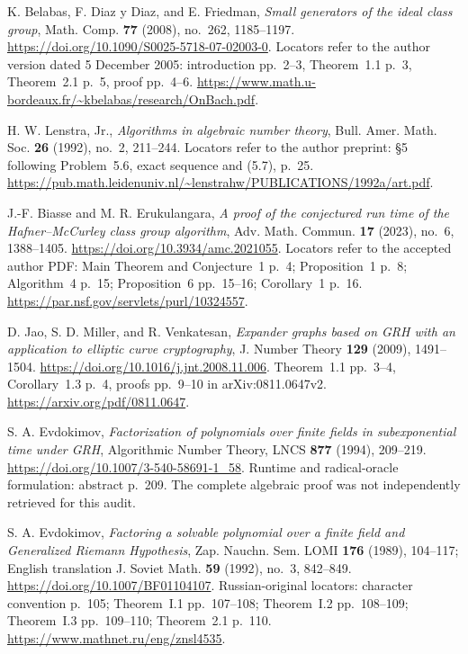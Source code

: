 K. Belabas, F. Diaz y Diaz, and E. Friedman,
\emph{Small generators of the ideal class group},
Math. Comp. \textbf{77} (2008), no.~262, 1185--1197.
\url{https://doi.org/10.1090/S0025-5718-07-02003-0}.
Locators refer to the author version dated 5 December 2005:
introduction pp.~2--3, Theorem~1.1 p.~3, Theorem~2.1 p.~5,
proof pp.~4--6.
\url{https://www.math.u-bordeaux.fr/~kbelabas/research/OnBach.pdf}.

H. W. Lenstra, Jr., \emph{Algorithms in algebraic number theory},
Bull. Amer. Math. Soc. \textbf{26} (1992), no.~2, 211--244.
Locators refer to the author preprint:
\S5 following Problem~5.6, exact sequence and (5.7), p.~25.
\url{https://pub.math.leidenuniv.nl/~lenstrahw/PUBLICATIONS/1992a/art.pdf}.

J.-F. Biasse and M. R. Erukulangara,
\emph{A proof of the conjectured run time of the Hafner--McCurley class group algorithm},
Adv. Math. Commun. \textbf{17} (2023), no.~6, 1388--1405.
\url{https://doi.org/10.3934/amc.2021055}.
Locators refer to the accepted author PDF: Main Theorem and Conjecture~1 p.~4;
Proposition~1 p.~8; Algorithm~4 p.~15; Proposition~6 pp.~15--16;
Corollary~1 p.~16.
\url{https://par.nsf.gov/servlets/purl/10324557}.

D. Jao, S. D. Miller, and R. Venkatesan,
\emph{Expander graphs based on GRH with an application to elliptic curve cryptography},
J. Number Theory \textbf{129} (2009), 1491--1504.
\url{https://doi.org/10.1016/j.jnt.2008.11.006}.
Theorem~1.1 pp.~3--4, Corollary~1.3 p.~4, proofs pp.~9--10
in arXiv:0811.0647v2.
\url{https://arxiv.org/pdf/0811.0647}.

S. A. Evdokimov,
\emph{Factorization of polynomials over finite fields in subexponential time under GRH},
Algorithmic Number Theory, LNCS \textbf{877} (1994), 209--219.
\url{https://doi.org/10.1007/3-540-58691-1_58}.
Runtime and radical-oracle formulation: abstract p.~209.
The complete algebraic proof was not independently retrieved for this audit.

S. A. Evdokimov,
\emph{Factoring a solvable polynomial over a finite field and Generalized Riemann Hypothesis},
Zap. Nauchn. Sem. LOMI \textbf{176} (1989), 104--117;
English translation J. Soviet Math. \textbf{59} (1992), no.~3, 842--849.
\url{https://doi.org/10.1007/BF01104107}.
Russian-original locators: character convention p.~105;
Theorem~I.1 pp.~107--108; Theorem~I.2 pp.~108--109;
Theorem~I.3 pp.~109--110; Theorem~2.1 p.~110.
\url{https://www.mathnet.ru/eng/znsl4535}.

